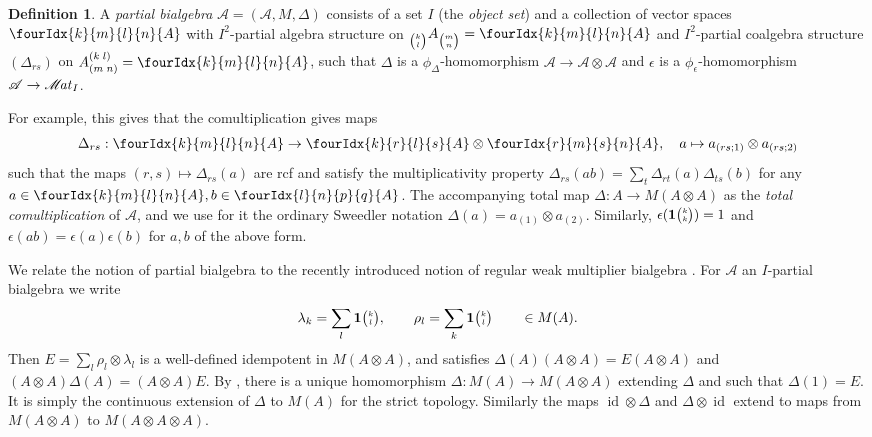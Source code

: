 \documentclass[10pt]{article}
\DeclareMathOperator{\id}{id}
\DeclareMathOperator{\Mat}{\mathscr{M}\!\it{at}}
\newcommand{\GrDA}[3]{{}_{#2}#1_{#3}} %
\newcommand{\Grt}[3]{#1{\tiny {\begin{pmatrix} #2\\#3\end{pmatrix}}}}
\newcommand{\pms}[2]{{\tiny {\begin{pmatrix} #1\\#2\end{pmatrix}}}}
\newcommand{\GrRA}[3]{#1^{#2}_{#3}} %
\newcommand{\UnitC}[2]{\Grt{\mathbf{1}}{#1}{#2}}
\newcommand{\Gr}[5]{\fourIdx{#2}{#4}{#3}{#5}{#1}}%
\theoremstyle{definition}
\newtheorem{Def}[Theorem]{Definition}
\numberwithin{equation}{section}
\begin{document}
\begin{Def}\label{DefPartBiAlg} A \emph{partial bialgebra} $\mathscr{A}=(\mathscr{A},M,\Delta)$ consists of a set $I$ (the \emph{object set}) and a collection of vector spaces $\Gr{A}{k}{l}{m}{n}$ with $I^2$-partial algebra structure on $\GrDA{A}{\pms{k}{l}}{\pms{m}{n}} = \Gr{A}{k}{l}{m}{n}$ and $I^2$-partial coalgebra structure $(\Delta_{rs})$ on $\GrRA{A}{(k\;l)}{(m\;n)}=\Gr{A}{k}{l}{m}{n}$, such that $\Delta$ is a $\phi_{\Delta}$-homomorphism $\mathscr{A}\rightarrow \mathscr{A}\otimes \mathscr{A}$ and $\epsilon$ is a $\phi_{\epsilon}$-homomorphism $\mathscr{A}\rightarrow \Mat_I$.\end{Def}

For example, this gives that the comultiplication gives maps \[\Delta_{rs}: \Gr{A}{k}{l}{m}{n}\rightarrow \Gr{A}{k}{l}{r}{s}\otimes \Gr{A}{r}{s}{m}{n},\quad a\mapsto a_{(rs;1)}\otimes a_{(rs;2)}\] such that the maps $(r,s) \mapsto \Delta_{rs}(a)$ are rcf and satisfy the multiplicativity property $\Delta_{rs}(ab) = \sum_t \Delta_{rt}(a)\Delta_{ts}(b)$ for any $a\in \Gr{A}{k}{l}{m}{n}, b\in \Gr{A}{l}{p}{n}{q}$. The accompanying total map $\Delta: A\rightarrow M(A\otimes A)$ as the \emph{total comultiplication} of $\mathscr{A}$, and we use for it the ordinary Sweedler notation $\Delta(a) = a_{(1)}\otimes a_{(2)}$.  Similarly, $\epsilon(\UnitC{k}{k})=1$ and $\epsilon(ab) = \epsilon(a)\epsilon(b)$ for $a,b$ of the above form. 

We relate the notion of partial bialgebra to the recently introduced notion of regular weak multiplier bialgebra \cite[Definition 2.1 and Definition 2.3]{Boh1}. For  $\mathscr{A}$ an $I$-partial bialgebra we write \[\lambda_k = \sum_l \UnitC{k}{l},\qquad \rho_l = \sum_k\UnitC{k}{l} \qquad \in M(A).\]  Then $E= \sum_l \rho_l\otimes \lambda_l$ is a well-defined idempotent in $M(A\otimes A)$, and satisfies $\Delta(A)(A\otimes A)=E(A\otimes A)$ and $(A\otimes A)\Delta(A)= (A\otimes A)E$. 
By \cite[Proposition A.3]{VDW2}, there is a unique homomorphism $\Delta:M(A)\rightarrow M(A\otimes A)$ extending $\Delta$ and such that $\Delta(1) = E$. It is simply the continuous extension of $\Delta$ to $M(A)$ for the strict topology. Similarly the maps $\id\otimes \Delta$ and $\Delta\otimes \id$ extend to maps from $M(A\otimes A)$ to $M(A\otimes A\otimes A)$. 

\end{document}
